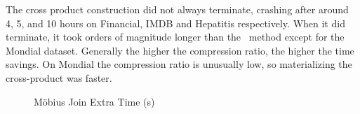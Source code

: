 \documentclass{sig-alternate-2013}
\begin{document}
The cross product construction did not always terminate, crashing after around 4, 5, and 10 hours on Financial, IMDB and Hepatitis respectively. When it did terminate, it took orders of magnitude longer than the \MJ ~method except for the Mondial dataset. Generally the higher the compression ratio, the higher the time savings. On Mondial the compression ratio is unusually low, so materializing the cross-product was faster. 
\begin{table}[htbp]
  \centering
%
  \caption{Number of Sufficient Statistics for Link Analysis On and Off. Extra Time refers to the total \MJ time (Table~\ref{table:cttimes} Col.2) minus the time for computing the positive statistics only.}
  \label{table:link-onoff}%
\end{table}%

\begin{figure}[htbp]
\begin{center}
\caption{M\"obius Join Extra Time (s)
\label{fig:runtime-vj}}
\end{center}
\end{figure}
\vfill\eject
\end{document}
